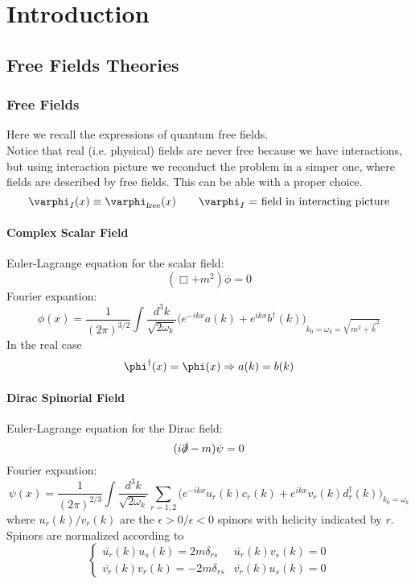 \documentclass[TheoreticalPhy_ModB.tex]{subfiles}
\begin{document}
\chapter{Introduction}

\section{Free Fields Theories}
\subsection{Free Fields}
Here we recall the expressions of quantum  free fields.\\
Notice that real (i.e. physical) fields are never free because we have interactions, but using interaction picture we reconduct the problem in a simper one, where fields are described by free fields. This can be able with a proper choice.
\[
\varphi_I (x) \equiv \varphi_{\textup{free}}(x) \qquad \varphi_I \text{ = field in interacting picture}
\]

\subsubsection{Complex Scalar Field}

Euler-Lagrange equation for the scalar field:
\[(\Box + m^2) \phi = 0\]
Fourier expantion:
\[
\phi(x) = \frac{1}{(2 \pi)^{3/2}} \int \frac{d^3 k}{\sqrt{2 \omega_k}} \bigl( e^{-ikx} a(k) + e^{ikx} b^{\dagger}(k) \bigr)_{k_0 = \omega_k=\sqrt{m^2 + \vec{k}^2}} 
\]
In the real case 
\[\phi^{\dagger}(x) = \phi(x) \so a(k) = b(k)\]

\subsubsection{Dirac Spinorial Field}
Euler-Lagrange equation for the Dirac field:
\[(i \slashed{\partial} - m) \psi = 0\]
Fourier expantion:
\[
\psi(x) = \frac{1}{(2 \pi)^{2/3}} \int \frac{d^3 k}{\sqrt{2 \omega_k}} \sum_{r=1,2} \bigl( e^{-ikx} u_r (k) c_r(k) + e^{ikx} v_r(k) d^{\dagger}_r(k) \bigr)_{k_0 = \omega_k} 
\]
where $u_r(k)/v_r(k)$ are the $\epsilon > 0/\epsilon <0$ spinors with helicity indicated by $r$.\\
Spinors are normalized according to
\[
\begin{cases}
\bar{u_r}(k) u_s(k) = 2m \delta_{rs}	& \bar{u_r}(k) v_s(k) = 0 \\
\bar{v_r}(k) v_r(k) = -2m \delta_{rs} 	& \bar{v_r}(k)u_s(k) = 0
\end{cases}
\]
\end{document}
